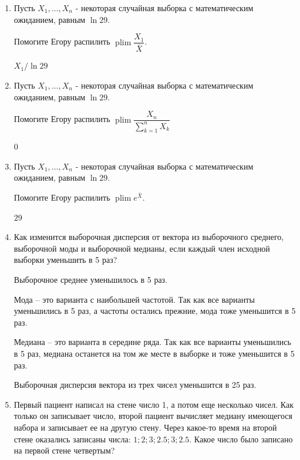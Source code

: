 \documentclass[12pt]{article}
\DeclareMathOperator{\plim}{plim}
\newenvironment{solution}{}{}
\begin{document}
\begin{enumerate}
    \item Пусть $X_1, \dots, X_n$ - некоторая случайная выборка с математическим ожиданием, равным $\ln{29}$. 
    
    Помогите Егору распилить $\plim{\dfrac{X_1}{\bar{X}}}$.
    
\begin{solution}
$X_1 / \ln 29$
\end{solution}
    
    \item Пусть $X_1, \dots, X_n$ - некоторая случайная выборка с математическим ожиданием, равным $\ln{29}$. 
    
    Помогите Егору распилить $\plim{\dfrac{X_n}{\sum_{k = 1}^n X_k}}$

\begin{solution}
$0$
\end{solution}

    
    \item Пусть $X_1, \dots, X_n$ - некоторая случайная выборка с математическим ожиданием, равным $\ln{29}$. 
    
    Помогите Егору распилить $\plim{e^{\bar{X}}}$.

\begin{solution}
$29$
\end{solution}


    \item Как изменится выборочная дисперсия от вектора из выборочного среднего, выборочной моды и выборочной медианы, если каждый член исходной выборки уменьшить в 5 раз?

\begin{solution}
Выборочное среднее уменьшилось в 5 раз.

Мода – это варианта с наибольшей частотой. Так как все варианты уменьшились в 5 раз, а частоты остались прежние, мода тоже уменьшится в 5 раз.

Медиана – это варианта в середине ряда. Так как все варианты уменьшились в 5 раз, медиана останется на том же месте в выборке и тоже уменьшится в 5 раз.

Выборочная дисперсия вектора из трех чисел уменьшится в 25 раз.
\end{solution}
   
    \item Первый пациент написал на стене число 1, а потом еще несколько чисел. Как только он записывает число, второй пациент вычисляет медиану имеющегося набора и записывает ее на другую стену. Через какое-то время на второй стене оказались записаны числа: $1; 2; 3; 2.5; 3; 2.5$. Какое число было записано на первой стене четвертым?
    

\end{enumerate}
\end{document}
